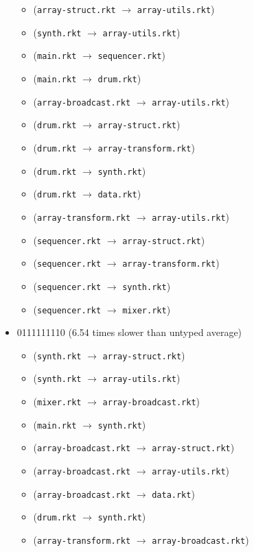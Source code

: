 \documentclass{article}
\newcommand{\mono}[1]{\texttt{#1}}
\begin{document}
\begin{itemize}
  \begin{itemize}
  \item (\mono{array-struct.rkt} $\rightarrow$ \mono{array-utils.rkt})
  \item (\mono{synth.rkt} $\rightarrow$ \mono{array-utils.rkt})
  \item (\mono{main.rkt} $\rightarrow$ \mono{sequencer.rkt})
  \item (\mono{main.rkt} $\rightarrow$ \mono{drum.rkt})
  \item (\mono{array-broadcast.rkt} $\rightarrow$ \mono{array-utils.rkt})
  \item (\mono{drum.rkt} $\rightarrow$ \mono{array-struct.rkt})
  \item (\mono{drum.rkt} $\rightarrow$ \mono{array-transform.rkt})
  \item (\mono{drum.rkt} $\rightarrow$ \mono{synth.rkt})
  \item (\mono{drum.rkt} $\rightarrow$ \mono{data.rkt})
  \item (\mono{array-transform.rkt} $\rightarrow$ \mono{array-utils.rkt})
  \item (\mono{sequencer.rkt} $\rightarrow$ \mono{array-struct.rkt})
  \item (\mono{sequencer.rkt} $\rightarrow$ \mono{array-transform.rkt})
  \item (\mono{sequencer.rkt} $\rightarrow$ \mono{synth.rkt})
  \item (\mono{sequencer.rkt} $\rightarrow$ \mono{mixer.rkt})
  \end{itemize}
\item 0111111110 (6.54 times slower than untyped average)
  \begin{itemize}
  \item (\mono{synth.rkt} $\rightarrow$ \mono{array-struct.rkt})
  \item (\mono{synth.rkt} $\rightarrow$ \mono{array-utils.rkt})
  \item (\mono{mixer.rkt} $\rightarrow$ \mono{array-broadcast.rkt})
  \item (\mono{main.rkt} $\rightarrow$ \mono{synth.rkt})
  \item (\mono{array-broadcast.rkt} $\rightarrow$ \mono{array-struct.rkt})
  \item (\mono{array-broadcast.rkt} $\rightarrow$ \mono{array-utils.rkt})
  \item (\mono{array-broadcast.rkt} $\rightarrow$ \mono{data.rkt})
  \item (\mono{drum.rkt} $\rightarrow$ \mono{synth.rkt})
  \item (\mono{array-transform.rkt} $\rightarrow$ \mono{array-broadcast.rkt})

\end{itemize}
\end{itemize}
\end{document}
